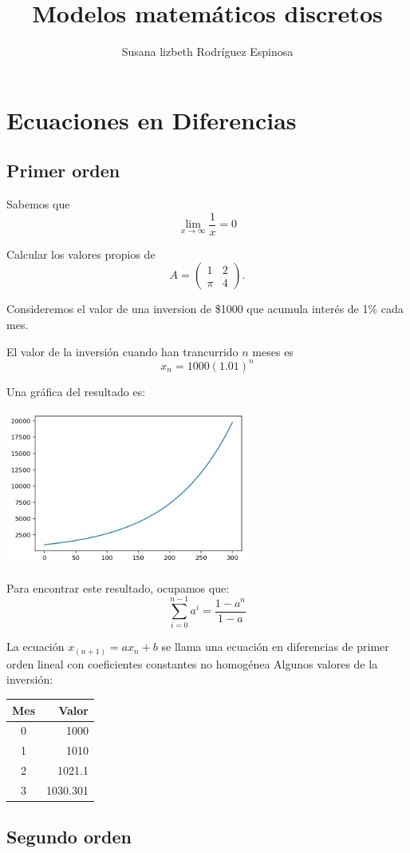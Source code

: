 \documentclass{article}
\title{Modelos matemáticos discretos}
\author{Susana lizbeth Rodríguez Espinosa}
\begin{document}
\maketitle
\section{Ecuaciones en Diferencias}
\subsection{Primer orden}
Sabemos que $$\lim_{x\to\infty}\frac{1}{x}=0$$

Calcular los valores propios de $$A=
\begin{pmatrix}
1 & 2\\
\pi & 4
\end{pmatrix}.
$$

Consideremos el valor de una inversion de \$1000 que acumula interés de 1\% cada mes.

El valor de la inversión cuando han trancurrido $n$ meses es $$x_n=1000(1.01)^n$$

Una gráfica del resultado es:

\begin{center}
\includegraphics[width=8cm]{grafica}
\end{center}

Para encontrar este resultado, ocupamos que:
$$\sum_{i=0}^{n-1}a^i=\frac{1-a^{n}}{1-a}$$

La ecuación $x_(n+1)=ax_n+b$ se llama una ecuación en diferencias de primer orden lineal con coeficientes constantes no homogénea
Algunos valores de la inversión:
\begin{center}
\begin{tabular}{|c|r|}
\hline
\hline
Mes & Valor\\
\hline
0 & 1000\\
1 & 1010\\
2 & 1021.1\\
3 & 1030.301\\
\hline
\end{tabular}
\end{center}




\subsection{Segundo orden}
\end{document}
